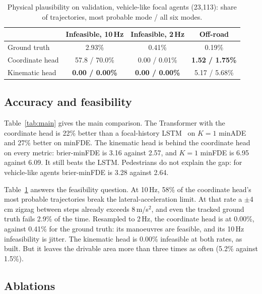 \documentclass[conference]{IEEEtran}
\begin{document}
\begin{table}[t]
\centering
\caption{Physical plausibility on validation, vehicle-like focal agents (23,113): share of
trajectories, most probable mode / all six modes.}
\label{tab:plaus}
\setlength{\tabcolsep}{4pt}
\begin{tabular}{lccc}
\toprule
& Infeasible, 10\,Hz & Infeasible, 2\,Hz & Off-road \\
\midrule
Ground truth & 2.93\% & 0.41\% & 0.19\% \\
Coordinate head & 57.8 / 70.0\% & 0.00 / 0.01\% & \textbf{1.52 / 1.75\%} \\
Kinematic head & \textbf{0.00 / 0.00\%} & \textbf{0.00 / 0.00\%} & 5.17 / 5.68\% \\
\bottomrule
\end{tabular}
\end{table}

\subsection{Accuracy and feasibility}
Table~\ref{tab:main} gives the main comparison. The Transformer with the coordinate head is 22\%
better than a focal-history LSTM~\cite{hochreiter1997lstm} on $K{=}1$ minADE and 27\% better on
minFDE. The kinematic head is behind the coordinate head on every metric: brier-minFDE is 3.16
against 2.57, and $K{=}1$ minFDE is 6.95 against 6.09. It still beats the LSTM. Pedestrians do not
explain the gap: for vehicle-like agents brier-minFDE is 3.28 against 2.64.

Table~\ref{tab:plaus} answers the feasibility question. At 10\,Hz, 58\% of the coordinate head's
most probable trajectories break the lateral-acceleration limit. At that rate a $\pm$4\,cm zigzag
between steps already exceeds 8\,m/s$^2$, and even the tracked ground truth fails 2.9\% of the
time. Resampled to 2\,Hz, the coordinate head is at 0.00\%, against 0.41\% for the ground truth:
its manoeuvres are feasible, and its 10\,Hz infeasibility is jitter. The kinematic head is 0.00\%
infeasible at both rates, as built. But it leaves the drivable area more than three times as often
(5.2\% against 1.5\%).

\subsection{Ablations}
\end{document}
